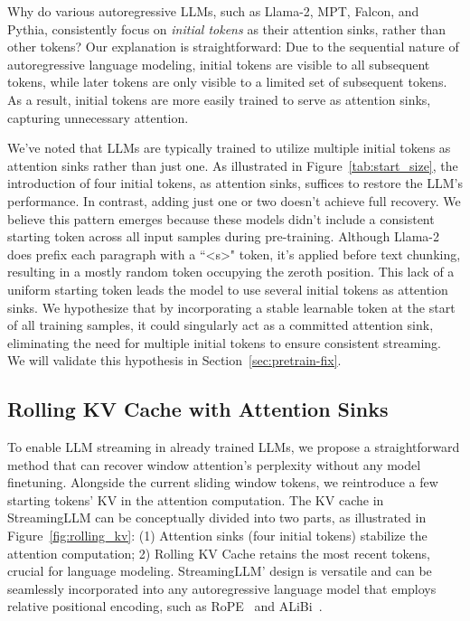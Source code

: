 Why do various autoregressive LLMs, such as Llama-2, MPT, Falcon, and Pythia, consistently focus on \textit{initial tokens} as their attention sinks, rather than other tokens? Our explanation is straightforward: Due to the sequential nature of autoregressive language modeling, initial tokens are visible to all subsequent tokens, while later tokens are only visible to a limited set of subsequent tokens. As a result, initial tokens are more easily trained to serve as attention sinks, capturing unnecessary attention.

We've noted that LLMs are typically trained to utilize multiple initial tokens as attention sinks rather than just one. As illustrated in Figure~\ref{tab:start_size}, the introduction of four initial tokens, as attention sinks, suffices to restore the LLM's performance. In contrast, adding just one or two doesn't achieve full recovery. We believe this pattern emerges because these models didn't include a consistent starting token across all input samples during pre-training. Although Llama-2 does prefix each paragraph with a ``<s>" token, it's applied before text chunking, resulting in a mostly random token occupying the zeroth position. This lack of a uniform starting token leads the model to use several initial tokens as attention sinks. We hypothesize that by incorporating a stable learnable token at the start of all training samples, it could singularly act as a committed attention sink, eliminating the need for multiple initial tokens to ensure consistent streaming. We will validate this hypothesis in Section~\ref{sec:pretrain-fix}.

\subsection{Rolling KV Cache with Attention Sinks}

To enable LLM streaming in already trained LLMs, we propose a straightforward method that can recover window attention's perplexity without any model finetuning. Alongside the current sliding window tokens, we reintroduce a few starting tokens' KV in the attention computation. The KV cache in StreamingLLM can be conceptually divided into two parts, as illustrated in Figure~\ref{fig:rolling_kv}: (1) Attention sinks (four initial tokens) stabilize the attention computation; 2) Rolling KV Cache retains the most recent tokens, crucial for language modeling. StreamingLLM' design is versatile and can be seamlessly incorporated into any autoregressive language model that employs relative positional encoding, such as RoPE~\citep{su2021roformer} and ALiBi~\citep{alibi}.

